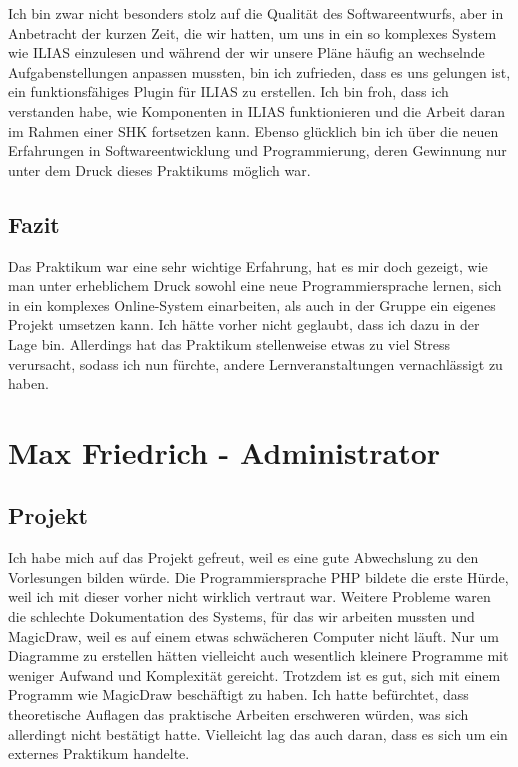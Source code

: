 \documentclass[a4paper]{scrreprt}
\begin{document}
Ich bin zwar nicht besonders stolz auf die Qualität des Softwareentwurfs, aber in Anbetracht der kurzen Zeit, die wir hatten, um uns in ein so komplexes System wie ILIAS einzulesen und während der wir unsere Pläne häufig an wechselnde Aufgabenstellungen anpassen mussten, bin ich zufrieden, dass es uns gelungen ist, ein funktionsfähiges Plugin für ILIAS zu erstellen. Ich bin froh, dass ich verstanden habe, wie Komponenten in ILIAS funktionieren und die Arbeit daran im Rahmen einer SHK fortsetzen kann. Ebenso glücklich bin ich über die neuen Erfahrungen in Softwareentwicklung und Programmierung, deren Gewinnung nur unter dem Druck dieses Praktikums möglich war.

\section{Fazit}
Das Praktikum war eine sehr wichtige Erfahrung, hat es mir doch gezeigt, wie man unter erheblichem Druck sowohl eine neue Programmiersprache lernen, sich in ein komplexes Online-System einarbeiten, als auch in der Gruppe ein eigenes Projekt umsetzen kann. Ich hätte vorher nicht geglaubt, dass ich dazu in der Lage bin. Allerdings hat das Praktikum stellenweise etwas zu viel Stress verursacht, sodass ich nun fürchte, andere Lernveranstaltungen vernachlässigt zu haben.


\chapter{Max Friedrich - Administrator}

\section{Projekt}

Ich habe mich auf das Projekt gefreut, weil es eine gute Abwechslung zu den Vorlesungen bilden würde. Die Programmiersprache PHP bildete die erste Hürde, weil ich mit dieser vorher nicht wirklich vertraut war. Weitere Probleme waren die schlechte Dokumentation des Systems, für das wir arbeiten mussten und MagicDraw, weil es auf einem etwas schwächeren Computer nicht läuft. Nur um Diagramme zu erstellen hätten vielleicht auch wesentlich kleinere Programme mit weniger Aufwand und Komplexität gereicht. Trotzdem ist es gut, sich mit einem Programm wie MagicDraw beschäftigt zu haben.
Ich hatte befürchtet, dass theoretische Auflagen das praktische Arbeiten erschweren würden, was sich allerdingt nicht bestätigt hatte. Vielleicht lag das auch daran, dass es sich um ein externes Praktikum handelte. 
\end{document}

